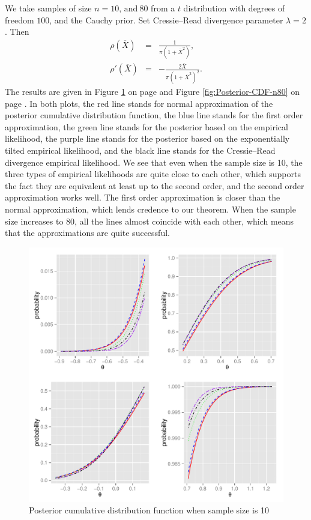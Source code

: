 \documentclass[oneside,english]{amsbook}
\numberwithin{section}{chapter}
\numberwithin{equation}{section}
\numberwithin{figure}{section}
\theoremstyle{plain}
\theoremstyle{plain}
\theoremstyle{definition}
\theoremstyle{plain}
\theoremstyle{plain}
\theoremstyle{remark}
\theoremstyle{definition}
\theoremstyle{definition}
\begin{document}
We take  samples of size $n=10,\mathrm{\, and}\:80$ from a $t$ distribution
with degrees of freedom $100$, and the Cauchy prior.
Set Cressie--Read divergence parameter $\lambda=2$ . Then 
\begin{eqnarray*}
\rho\left(\overline{X}\right) & = & \frac{1}{\pi\left(1+\overline{X}^{2}\right)},\\
\rho'\left(\overline{X}\right) & = & -\frac{2\overline{X}}{\pi\left(1+\overline{X}^{2}\right)^{2}}.
\end{eqnarray*}
The results are given in Figure \ref{fig:Posterior-CDF-n10} on page \pageref{fig:Posterior-CDF-n10} and Figure \ref{fig:Posterior-CDF-n80} on page \pageref{fig:Posterior-CDF-n80}.
In both plots, the red line stands for normal approximation of the posterior
cumulative distribution function, the blue line stands for the first
order approximation, the green line stands for the posterior based
on the empirical likelihood, the purple line stands for the posterior
based on the exponentially tilted empirical likelihood, and   the black line
stands for the Cressie--Read divergence empirical likelihood. We 
see that even when the sample size is 10, the three types of empirical
likelihoods are quite close to each other, which supports the fact
they are equivalent  at least up to the second order, and the second order
 approximation works well. The first order approximation is closer
than the normal approximation, which lends credence to our theorem.
When the sample size increases to 80, all the lines almost coincide
with each other, which means that the approximations are quite successful.
\begin{figure}[H]

\begin{center}
\includegraphics[scale=0.5]{n10bw.pdf}\protect\caption{Posterior cumulative distribution function when sample size is 10\label{fig:Posterior-CDF-n10}}
\end{center}

\end{figure}
\end{document}
